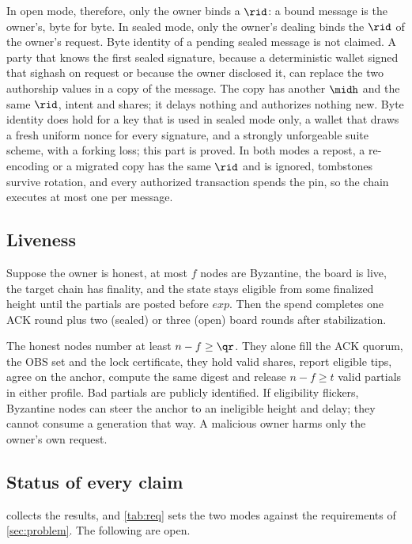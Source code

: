 In open mode, therefore, only the owner binds a $\rid$: a bound message is the owner's, byte for byte. In sealed mode, only the owner's dealing binds the $\rid$ of the owner's request. Byte identity of a pending sealed message is not claimed. A party that knows the first sealed signature, because a deterministic wallet signed that sighash on request or because the owner disclosed it, can replace the two authorship values in a copy of the message. The copy has another $\midh$ and the same $\rid$, intent and shares; it delays nothing and authorizes nothing new. Byte identity does hold for a key that is used in sealed mode only, a wallet that draws a fresh uniform nonce for every signature, and a strongly unforgeable suite scheme, with a forking loss; this part is proved. In both modes a repost, a re-encoding or a migrated copy has the same $\rid$ and is ignored, tombstones survive rotation, and every authorized transaction spends the pin, so the chain executes at most one per message.

\subsection{Liveness}

\begin{proposition}\label{prop:live}
Suppose the owner is honest, at most $f$ nodes are Byzantine, the board is live, the target chain has finality, and the state stays eligible from some finalized height until the partials are posted before $exp$. Then the spend completes one ACK round plus two (sealed) or three (open) board rounds after stabilization.
\end{proposition}

The honest nodes number at least $n - f \ge \qr$. They alone fill the ACK quorum, the OBS set and the lock certificate, they hold valid shares, report eligible tips, agree on the anchor, compute the same digest and release $n - f \ge t$ valid partials in either profile. Bad partials are publicly identified. If eligibility flickers, Byzantine nodes can steer the anchor to an ineligible height and delay; they cannot consume a generation that way. A malicious owner harms only the owner's own request.

\subsection{Status of every claim}\label{sec:status}

 collects the results, and \cref{tab:req} sets the two modes against the requirements of \cref{sec:problem}. The following are open.


